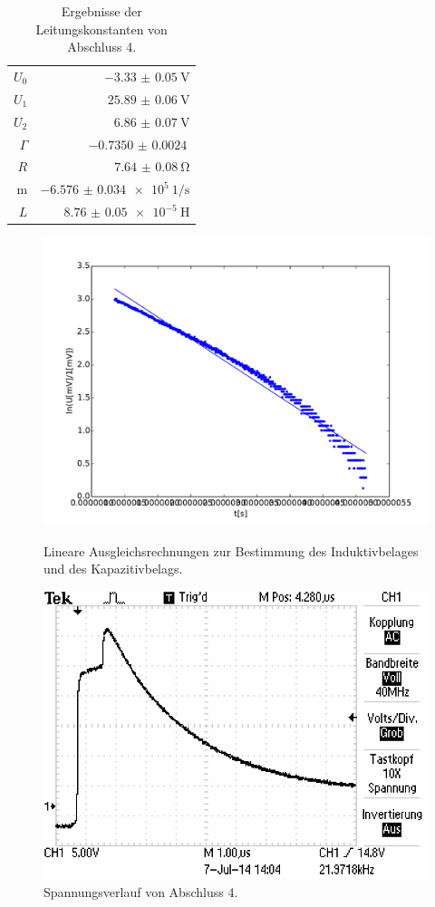 \begin{table}
\centering
	\caption[]{Ergebnisse der Leitungskonstanten von Abschluss 4.}
	\begin{tabular}{r|r}
		\toprule
		$U_0$    & $\SI{-3.33(5)}{\volt}$\\
		$U_1$    & $\SI{25.89(6)}{\volt}$\\
		$U_2$    & $\SI{6.86(7)}{\volt}$\\
		$\Gamma$ & $\SI{-0.7350(24)}{}$\\
		$R$    & $\SI{7.64(8)}{\ohm}$\\
		m      & $\SI{-6.576(34)e5}{1\per\second}$\\
		$L$    & $\SI{8.76(5)e-5}{\henry}$\\
		\bottomrule
	\end{tabular}
\end{table}

\begin{figure}
	\centering
	\includegraphics[width = 14cm]{data/d/Regression2.pdf}
	\caption{Lineare Ausgleichsrechnungen zur Bestimmung des Induktivbelages und des Kapazitivbelags.}
	\includegraphics[width = 12cm]{data/d/F0005TEK.JPG}
	\caption{Spannungsverlauf von Abschluss 4.}
	\label{fig_abs4}
\end{figure}
